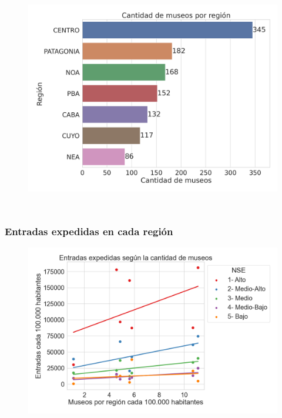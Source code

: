 \documentclass{beamer}
\begin{document}
\begin{frame}
\begin{columns}
\begin{figure}
\includegraphics[height=0.45\textheight]{cantidad_museos.png}
\label{fig:cant_museos}
\end{figure}
\end{columns}

\end{frame}

\begin{frame}
\frametitle{Entradas expedidas en cada región}

\begin{figure}
\centering
\includegraphics[width=\textwidth]{modelo_entrada_museo}
\label{fig:modelo_entrada_museo}
\end{figure}

\end{frame}
\end{document}
